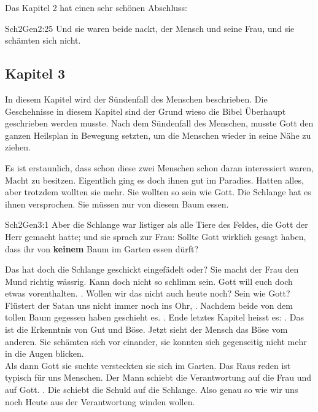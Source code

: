 Das Kapitel 2 hat einen sehr schönen Abschluss:
\begin{bibeltext}{Sch2}{Gen}{2:25}
	Und sie waren beide nackt, der Mensch und seine Frau, und sie schämten sich nicht.
\end{bibeltext}
\subsection{Kapitel 3}
In diesem Kapitel wird der Sündenfall des Menschen beschrieben. Die Geschehnisse in diesem Kapitel sind der Grund wieso die Bibel Überhaupt geschrieben werden musste. Nach dem Sündenfall des Menschen, musste Gott den ganzen Heilsplan in Bewegung setzten, um die Menschen wieder in seine Nähe zu ziehen.

Es ist erstaunlich, dass schon diese zwei Menschen schon daran interessiert waren, Macht zu besitzen. Eigentlich ging es doch ihnen gut im Paradies. Hatten alles, aber trotzdem wollten sie mehr. Sie wollten so sein wie Gott. Die Schlange hat es ihnen versprochen. Sie müssen nur von diesem Baum essen.
\begin{bibeltext}{Sch2}{Gen}{3:1}
	Aber die Schlange war listiger als alle Tiere des Feldes, die Gott der Herr gemacht hatte; und sie sprach zur Frau: Sollte Gott wirklich gesagt haben, dass ihr von \textbf{keinem} Baum im Garten essen dürft?
\end{bibeltext}
Das hat doch die Schlange geschickt eingefädelt oder? Sie macht der Frau den Mund richtig wässrig. Kann doch nicht so schlimm sein. Gott will euch doch etwas vorenthalten. . Wollen wir das nicht auch heute noch? Sein wie Gott? Flüstert der Satan uns nicht immer noch ins Ohr, .
Nachdem beide von dem tollen Baum gegessen haben geschieht es. . Ende letztes Kapitel heisst es: . Das ist die Erkenntnis von Gut und Böse. Jetzt sieht der Mensch das Böse vom anderen. Sie schämten sich vor einander, sie konnten sich gegenseitig nicht mehr in die Augen blicken.\\
Als dann Gott sie suchte versteckten sie sich im Garten. Das Raus reden ist typisch für uns Menschen. Der Mann schiebt die Verantwortung auf die Frau und auf Gott. . Die schiebt die Schuld auf die Schlange. Also genau so wie wir uns noch Heute aus der Verantwortung winden wollen.

